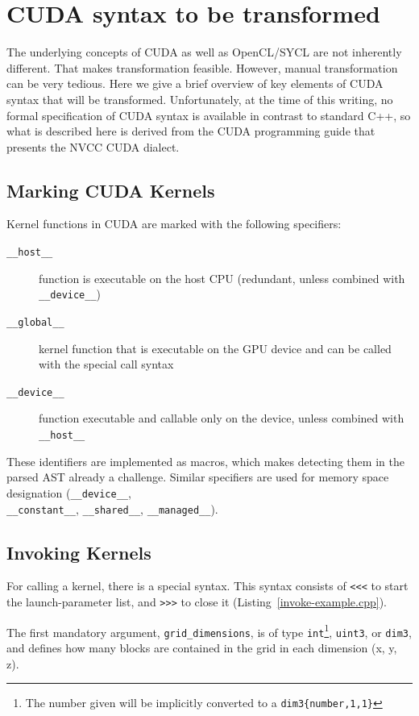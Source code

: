 \documentclass[sigconf]{acmart}
\newcommand{\inputcode}[2]{}
\newcommand{\tcode}[1]{\texttt{#1}}
\newcommand{\intt}[1]{\texttt{#1}}
\begin{document}
\section{CUDA syntax to be transformed}
The underlying concepts of CUDA as well as OpenCL/SYCL are not inherently different. That makes transformation feasible. However, manual transformation can be very tedious.
Here we give a brief overview of key elements of CUDA syntax that will be transformed. Unfortunately, at the time of this writing, no formal specification of CUDA syntax is available in contrast to standard C++\cite{isocpp}, so what is described here is derived from  the CUDA programming guide\cite{CUDACProgGuide} that presents the NVCC CUDA dialect.

\subsection{Marking CUDA Kernels}
Kernel functions in CUDA are marked with the following specifiers:
\begin{description}
\item[\tcode{__host__}] function is executable on the host CPU (redundant, unless combined with \tcode{__device__})
\item[\tcode{__global__}] kernel function that is executable on the GPU device and can be called with the special call syntax
\item[\tcode{__device__}] function executable and callable only on the device, unless combined with \tcode{__host__}
\end{description}
These identifiers are implemented as macros, which makes detecting them in the parsed AST already a challenge. Similar specifiers are used for memory space designation (\tcode{__device__}, \\\tcode{__constant__}, \tcode{__shared__}, \tcode{__managed__}). 


\subsection{Invoking Kernels}
    For calling a kernel, there is a special syntax. This syntax consists of \intt{<{}<{}<} to start the launch-parameter list, and \intt{>{}>{}>} to close it (Listing~\ref{invoke-example.cpp}).
    
    \inputcode{invoke-example.cpp}{Special CUDA kernel invocation syntax}
    
    The first mandatory argument, \intt{grid_dimensions}, is of type \intt{int}\footnote{The number given will be implicitly converted to a \intt{dim3\{number,1,1\}}}, \intt{uint3}, or \intt{dim3}, and defines how many blocks are contained in the grid in each dimension (x, y, z). %
    
\end{document}
